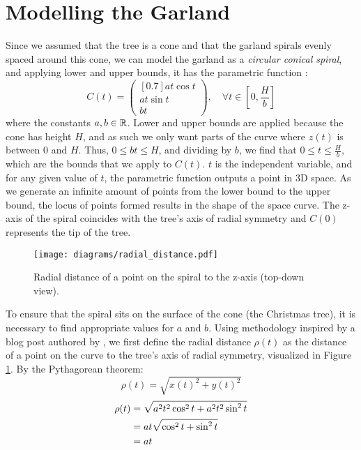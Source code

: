 \section{Modelling the Garland}

Since we assumed that the tree is a cone and that the garland spirals evenly spaced around this cone, we can model the garland as a \emph{circular conical spiral}, and applying lower and upper bounds, it has the parametric function \autocite{rejbrandConicalHelix}:
\begin{equation}
    C(t) = \begin{pmatrix}[0.7]
        at\cos{t} \\
        at\sin{t} \\
        bt
    \end{pmatrix}, \quad \forall t \in \left[0, \frac{H}{b}\right]
\end{equation}
where the constants $a, b \in \mathbb{R}$. Lower and upper bounds are applied because the cone has height $H$, and as such we only want parts of the curve where $z(t)$ is between $0$ and $H$. Thus, $0 \leq bt \leq H$, and dividing by $b$, we find that $0 \leq t \leq \frac{H}{b}$, which are the bounds that we apply to $C(t)$. $t$ is the independent variable, and for any given value of $t$, the parametric function outputs a point in 3D space. As we generate an infinite amount of points from the lower bound to the upper bound, the locus of points formed results in the shape of the space curve. The z-axis of the spiral coincides with the tree's axis of radial symmetry and $C(0)$ represents the tip of the tree.

\begin{figure}[H]
    \centering
    \texttt{[image: diagrams/radial\_distance.pdf]}
    \caption{Radial distance of a point on the spiral to the z-axis (top-down view).} \label{fig:radial}
    \vspace*{-15pt}
\end{figure}

To ensure that the spiral sits on the surface of the cone (the Christmas tree), it is necessary to find appropriate values for $a$ and $b$. Using methodology inspired by a blog post authored by \citeauthor{stewartGarland2014}, we first define the radial distance $\rho(t)$ as the distance of a point on the curve to the tree's axis of radial symmetry, visualized in Figure \ref{fig:radial}. By the Pythagorean theorem:
\begin{equation*}
    \rho(t) = \sqrt{x(t)^2+y(t)^2}
\end{equation*}
\begin{align}
    \rho(t) & = \sqrt{a^2t^2\cos^2{t}+a^2t^2\sin^2{t}} \notag \\
            & = at\sqrt{\cos^2{t}+\sin^2{t}} \notag           \\
            & = at
\end{align}

